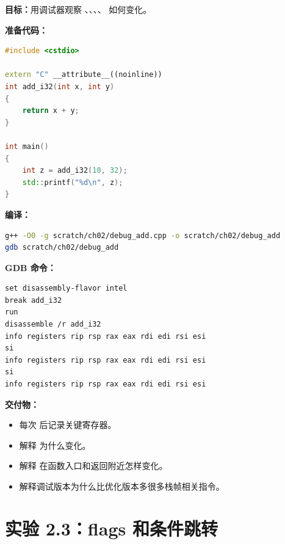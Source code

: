\begin{labbox}
\textbf{目标：}用调试器观察 、、、、 如何变化。

\textbf{准备代码：}

\begin{lstlisting}[language=C++]
#include <cstdio>

extern "C" __attribute__((noinline))
int add_i32(int x, int y)
{
    return x + y;
}

int main()
{
    int z = add_i32(10, 32);
    std::printf("%d\n", z);
}
\end{lstlisting}

\textbf{编译：}

\begin{lstlisting}[language=bash]
g++ -O0 -g scratch/ch02/debug_add.cpp -o scratch/ch02/debug_add
gdb scratch/ch02/debug_add
\end{lstlisting}

\textbf{GDB 命令：}

\begin{lstlisting}
set disassembly-flavor intel
break add_i32
run
disassemble /r add_i32
info registers rip rsp rax eax rdi edi rsi esi
si
info registers rip rsp rax eax rdi edi rsi esi
si
info registers rip rsp rax eax rdi edi rsi esi
\end{lstlisting}

\textbf{交付物：}

\begin{itemize}
  \item 每次  后记录关键寄存器。
  \item 解释  为什么变化。
  \item 解释  在函数入口和返回附近怎样变化。
  \item 解释调试版本为什么比优化版本多很多栈帧相关指令。
\end{itemize}
\end{labbox}

\section{实验 2.3：flags 和条件跳转}

